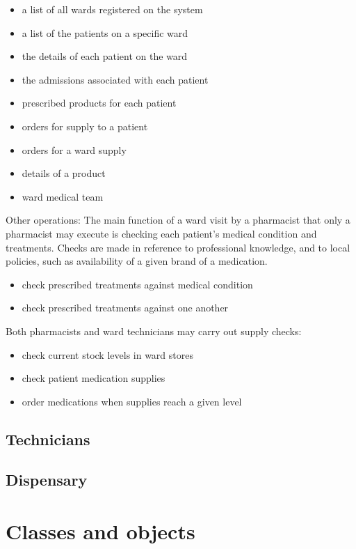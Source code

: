 \documentclass[letterpaper]{amsart}
\begin{document}
\begin{itemize}
    \item a list of all wards registered on the system
    \item a list of the patients on a specific ward
    \item the details of each patient on the ward
    \item the admissions associated with each patient
    \item prescribed products for each patient
    \item orders for supply to a patient
    \item orders for a ward supply
    \item details of a product
    \item ward medical team
\end{itemize}

Other operations:
The main function of a ward visit by a pharmacist that only a pharmacist may execute is checking each patient's medical condition and treatments.  Checks are made in reference to professional knowledge, and to local policies, such as availability of a given brand of a medication.
\begin{itemize}
    \item check prescribed treatments against medical condition
    \item check prescribed treatments against one another
\end{itemize}
Both pharmacists and ward technicians may carry out supply checks:
\begin{itemize}
    \item check current stock levels in ward stores 
    \item check patient medication supplies 
    \item order medications when supplies reach a given level
\end{itemize}

\subsection{Technicians}

\subsection{Dispensary}

\section{Classes and objects}
\end{document}
